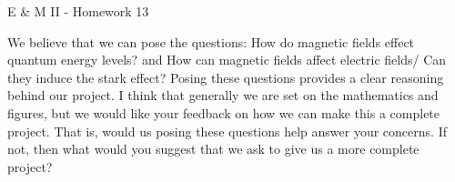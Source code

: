 \documentclass[11pt]{article}
\begin{document}
 

\begin{center}
	{\Large E \& M II - Homework 13}
\end{center}

We believe that we can pose the questions: How do magnetic fields effect quantum energy levels? and How can magnetic fields affect electric fields/ Can they induce the stark effect?  Posing these questions provides a clear reasoning behind our project.  I think that generally we are set on the mathematics and figures, but we would like your feedback on how we can make this a complete project.  That is, would us posing these questions help answer your concerns.  If not, then what would you suggest that we ask to give us a more complete project?



\end{document}
